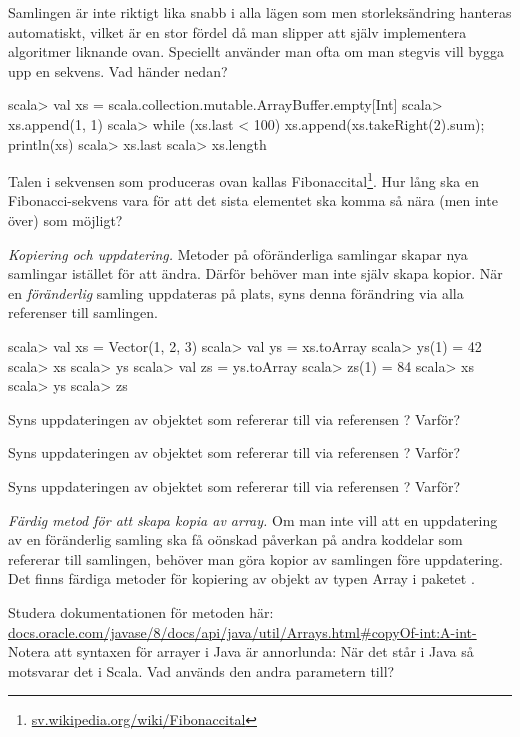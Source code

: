 \Subtask Samlingen  är inte riktigt lika snabb i alla lägen som  men storleksändring hanteras automatiskt, vilket är en stor fördel då man slipper att själv implementera algoritmer liknande  ovan. Speciellt använder man ofta  om man stegvis vill bygga upp en sekvens. Vad händer nedan?
\begin{REPL}
scala> val xs = scala.collection.mutable.ArrayBuffer.empty[Int]
scala> xs.append(1, 1)
scala> while (xs.last < 100) {xs.append(xs.takeRight(2).sum); println(xs)}
scala> xs.last
scala> xs.length
\end{REPL}

\Subtask Talen i sekvensen som produceras ovan kallas Fibonaccital\footnote{\href{https://sv.wikipedia.org/wiki/Fibonaccital}{sv.wikipedia.org/wiki/Fibonaccital}}. Hur lång ska en Fibonacci-sekvens vara för att det sista elementet ska komma så nära (men inte över)  som möjligt?



\Task \emph{Kopiering och uppdatering.} Metoder på oföränderliga samlingar skapar nya samlingar istället för att ändra. Därför behöver man inte själv skapa kopior. När en \emph{föränderlig} samling uppdateras på plats, syns denna förändring via alla referenser till samlingen.

\begin{REPL}
scala> val xs = Vector(1, 2, 3)
scala> val ys = xs.toArray
scala> ys(1) = 42
scala> xs
scala> ys
scala> val zs = ys.toArray
scala> zs(1) = 84
scala> xs
scala> ys
scala> zs
\end{REPL}

\Subtask Syns uppdateringen av objektet som  refererar till via referensen ? Varför?

\Subtask Syns uppdateringen av objektet som  refererar till via referensen ? Varför? 

\Subtask Syns uppdateringen av objektet som  refererar till via referensen ? Varför?

\Task \emph{Färdig metod för att skapa kopia av array.} Om man inte vill att en uppdatering av en föränderlig samling ska få oönskad påverkan på andra koddelar som refererar till samlingen, behöver man göra kopior av samlingen före uppdatering. Det finns färdiga metoder för kopiering av objekt av typen Array i paketet . 

\Subtask\Pen Studera dokumentationen för metoden  här:\\ \href{https://docs.oracle.com/javase/8/docs/api/java/util/Arrays.html\#copyOf-int:A-int-}{docs.oracle.com/javase/8/docs/api/java/util/Arrays.html\#copyOf-int:A-int-} \\
Notera att syntaxen för arrayer i Java är annorlunda: När det står  i Java så motsvarar det  i Scala. Vad används den andra parametern till?

